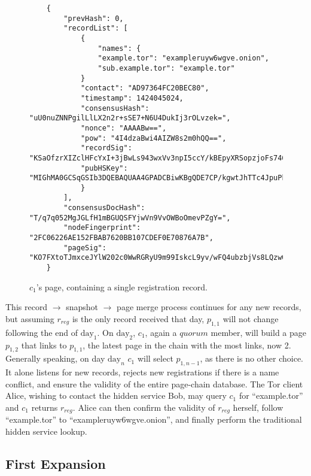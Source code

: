 \begin{figure}
\begin{lstlisting}
	{
		"prevHash": 0,
		"recordList": [
			{
				"names": {
				"example.tor": "exampleruyw6wgve.onion",
				"sub.example.tor": "example.tor"
			}
			"contact": "AD97364FC20BEC80",
			"timestamp": 1424045024,
			"consensusHash": "uU0nuZNNPgilLlLX2n2r+sSE7+N6U4DukIj3rOLvzek=",
			"nonce": "AAAABw==",
			"pow": "4I4dzaBwi4AIZW8s2m0hQQ==",
			"recordSig": 	"KSaOfzrXIZclHFcYxI+3jBwLs943wxVv3npI5ccY/kBEpyXRSopzjoFs746n0tJqUpdY4Kbe6DBwERaN7ELmSSK9Pu6q8QeKzNAh+QOnKl0fKBN7fqowjkQ3ktFkR0Vuox9WrrbNTMa4+up0Np52hlbKA3zSRz4fbR9NVlh6uuQ=",
			"pubHSKey": "MIGhMA0GCSqGSIb3DQEBAQUAA4GPADCBiwKBgQDE7CP/kgwtJhTTc4JpuPkvA7Ln9wgc+fgTKgkyUp1zusxgUAn1c1MGx4YhO42KPB7dyZOf3pcRk94XsYFY1ULkF2+tf9KdNe7GFzJyMFCQENnUcVXbcwLH4vAeiGK7R/nScbCbyc9LT+VE1fbKchTL1QzLVBLqJTxhR+9YPi8x+QIFAdZ8BJs="
			}
		],
		"consensusDocHash": "T/q7q052MgJGLfH1mBGUQSFYjwVn9VvOWBoOmevPZgY=",
		"nodeFingerprint": "2FC06226AE152FBAB7620BB107CDEF0E70876A7B",
		"pageSig": "KO7FXtoTJmxceJYlW202c0WwRGRyU9m99IskcL9yv/wFQ4ubzbjVs8LQzwQub9kDJ8Htpc9rRZvneRRbusFv1nvaeJw+WgRt+Tck0uapndHKYaQcK3XTIFYdmT1lLm7QxSKjnIxgBkwKT0QWdGLUhuRgGe5CXmqrPeDfU/gsgLs="
	}
\end{lstlisting}
\caption{$ c_{1} $'s page, containing a single registration record.}
\label{sampleLabel}
\end{figure}

This record $ \to $ snapshot $ \to $ page merge process continues for any new records, but assuming $ r_{reg} $ is the only record received that day, $ p_{1,1} $ will not change following the end of $ \textrm{day}_{1} $. On $ \textrm{day}_{2} $, $ c_{1} $, again a $ quorum $ member, will build a page $ p_{1,2} $ that links to $ p_{1,1} $, the latest page in the chain with the most links, now 2. Generally speaking, on day $ \textrm{day}_{n} $ $ c_{1} $ will select $ p_{1,n-1} $, as there is no other choice. It alone listens for new records, rejects new registrations if there is a name conflict, and ensure the validity of the entire page-chain database. The Tor client Alice, wishing to contact the hidden service Bob, may query $ c_{1} $ for ``example.tor'' and $ c_{1} $ returns $ r_{reg} $. Alice can then confirm the validity of $ r_{reg} $ herself, follow ``example.tor'' to ``exampleruyw6wgve.onion'', and finally perform the traditional hidden service lookup.

\subsection{First Expansion}

